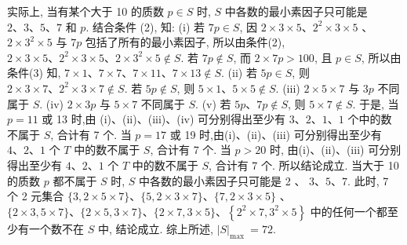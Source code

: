 实际上, 当有某个大于 10 的质数 $p \in S$ 时, $S$ 中各数的最小素因子只可能是 $2 、 3 、 5 、 7$ 和 $p$. 结合条件 (2), 知: (i) 若 $7 p \in S$, 因 $2 \times 3 \times 5 、 2^2 \times 3 \times 5$ 、 $2 \times 3^2 \times 5$ 与 $7 p$ 包括了所有的最小素因子, 所以由条件(2), $2 \times 3 \times 5 、 2^2 \times 3 \times 5 、 2 \times 3^2 \times 5 \notin S$. 若 $7 p \notin S$, 而 $2 \times 7 p>100$, 且 $p \in S$, 所以由条件(3) 知, $7 \times 1 、 7 \times 7 、 7 \times 11 、 7 \times 13 \notin S$. (ii) 若 $5 p \in S$, 则 $2 \times 3 \times 7 、 2^2 \times 3 \times 7 \notin S$. 若 $5 p \notin S$, 则 $5 \times 1 、 5 \times 5 \notin S$. (iii) $2 \times 5 \times 7$ 与 $3 p$ 不同属于 $S$. (iv) $2 \times 3 p$ 与 $5 \times 7$ 不同属于 $S$. (v) 若 $5 p 、 7 p \notin S$, 则 $5 \times 7 \notin S$. 于是, 当 $p=11$ 或 13 时,由 (i)、(ii)、(iii)、(iv) 可分别得出至少有 $3 、 2 、 1 、 1$ 个中的数不属于 $S$, 合计有 7 个.
当 $p=17$ 或 19 时,由(i)、(ii)、(iii) 可分别得出至少有 $4 、 2 、 1$ 个 $T$ 中的数不属于 $S$, 合计有 7 个.
当 $p>20$ 时, 由(i)、(ii)、(iii) 可分别得出至少有 $4 、 2 、 1$ 个 $T$ 中的数不属于 $S$, 合计有 7 个.
所以结论成立.
当大于 10 的质数 $p$ 都不属于 $S$ 时, $S$ 中各数的最小素因子只可能是 2 、 $3 、 5 、 7$. 此时, 7 个 2 元集合 $\{3,2 \times 5 \times 7\} 、\{5,2 \times 3 \times 7\} 、\{7,2 \times 3 \times 5\}$ 、 $\{2 \times 3,5 \times 7\} 、\{2 \times 5,3 \times 7\} 、\{2 \times 7,3 \times 5\} 、\left\{2^2 \times 7,3^2 \times 5\right\}$ 中的任何一个都至少有一个数不在 $S$ 中, 结论成立.
综上所述, $|S|_{\text {max }}=72$.




